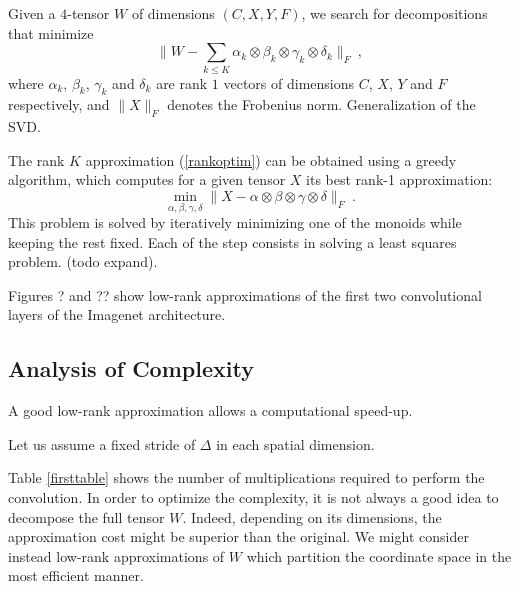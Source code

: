 \documentclass{article}
\begin{document}
Given a $4$-tensor $W$ of dimensions $(C,X,Y,F)$, we search for decompositions 
that minimize 
\begin{equation}
\label{rankoptim}
\| W - \sum_{k\leq K} \alpha_k \otimes \beta_k \otimes \gamma_k \otimes \delta_k\|_F~,
\end{equation}
where $\alpha_k$, $\beta_k$, $\gamma_k$ and $\delta_k$ are 
rank $1$ vectors of dimensions $C$, $X$, $Y$ and $F$ respectively, and
$\| X \|_F$ denotes the Frobenius norm. Generalization of the SVD.

The rank $K$ approximation (\ref{rankoptim}) can be obtained using a greedy 
algorithm, which computes for a given tensor $X$ its best rank-1 approximation:
\begin{equation}
\label{pla}
\min_{\alpha, \beta, \gamma, \delta} \| X - \alpha \otimes \beta \otimes \gamma \otimes \delta \|_F ~.
\end{equation}
This problem is solved by iteratively minimizing one of the monoids while keeping 
the rest fixed. Each of the step consists in solving a least squares problem. (todo expand).

Figures ? and ?? show low-rank approximations of the first two convolutional
layers of the Imagenet architecture.


\subsection{Analysis of Complexity}

A good low-rank approximation allows a computational speed-up. 

Let us assume a fixed stride of $\Delta$ in each spatial dimension. 


Table \ref{firsttable} shows the number of multiplications required to perform the 
convolution. In order to optimize the complexity, it is not always a good idea 
to decompose the full tensor $W$. Indeed, depending on its dimensions, 
the approximation cost might be superior than the original.
We might consider instead low-rank approximations of $W$ 
which partition the coordinate space in the most efficient manner.
\end{document}
